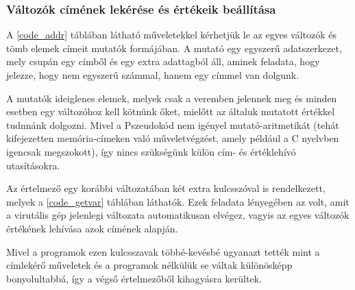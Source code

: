 \subsubsection{Változók címének lekérése és értékeik beállítása}


A \ref{code_addr} táblában látható műveletekkel kérhetjük le az egyes változók és tömb elemek címeit mutatók formájában. A mutató egy egyszerű adatszerkezet, mely csupán egy címből és egy extra adattagból áll, aminek feladata, hogy jelezze, hogy nem egyszerű számmal, hanem egy címmel van dolgunk.

A mutatók ideiglenes elemek, melyek csak a veremben jelennek meg és minden esetben egy változóhoz kell kötnünk őket, mielőtt az általuk mutatott értékkel tudnnánk dolgozni. Mivel a Pszeudokód nem igényel mutató-aritmetikát (tehát kifejezetten memória-címeken való műveletvégzést, amely például a C nyelvben igencsak megszokott), így nincs szükségünk külön cím- és értéklehívó utasításokra.


Az értelmező egy korábbi változatában két extra kulcsszóval is rendelkezett, melyek a \ref{code_getvar} táblában láthatók. Ezek feladata lényegében az volt, amit a virutális gép jelenlegi változata automatikusan elvégez, vagyis az egyes változók értékének lehívása azok címének alapján.

Mivel a programok ezen kulcsszavak többé-kevésbé ugyanazt tették mint a címlekérő műveletek és a programok nélkülük se váltak különösképp bonyolultabbá, így a végső értelmezőből kihagyásra kerültek.

